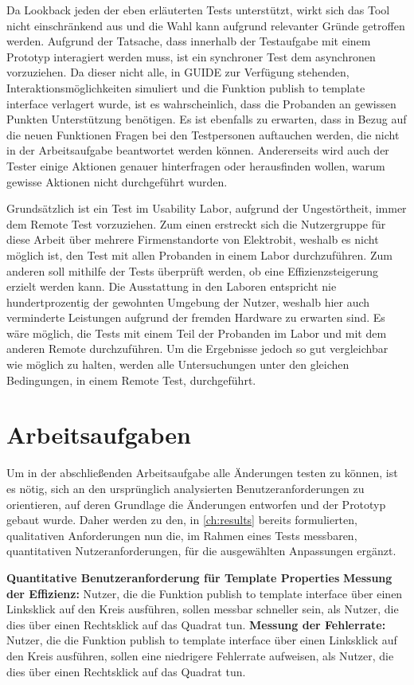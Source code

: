 Da Lookback jeden der eben erläuterten Tests unterstützt, wirkt sich das Tool nicht einschränkend aus und die Wahl kann aufgrund relevanter Gründe getroffen werden.
Aufgrund der Tatsache, dass innerhalb der Testaufgabe mit einem Prototyp interagiert werden muss, ist ein synchroner Test dem asynchronen vorzuziehen.
Da dieser nicht alle, in GUIDE zur Verfügung stehenden, Interaktionsmöglichkeiten simuliert und die Funktion \glqq publish to template interface\grqq{} verlagert wurde, ist es wahrscheinlich, dass die Probanden an gewissen Punkten Unterstützung benötigen.
Es ist ebenfalls zu erwarten, dass in Bezug auf die neuen Funktionen Fragen bei den Testpersonen auftauchen werden, die nicht in der Arbeitsaufgabe beantwortet werden können.
Andererseits wird auch der Tester einige Aktionen genauer hinterfragen oder herausfinden wollen, warum gewisse Aktionen nicht durchgeführt wurden.

Grundsätzlich ist ein Test im Usability Labor, aufgrund der Ungestörtheit, immer dem Remote Test vorzuziehen.
Zum einen erstreckt sich die Nutzergruppe für diese Arbeit über mehrere Firmenstandorte von Elektrobit, weshalb es nicht möglich ist, den Test mit allen Probanden in einem Labor durchzuführen.
Zum anderen soll mithilfe der Tests überprüft werden, ob eine Effizienzsteigerung erzielt werden kann.
Die Ausstattung in den Laboren entspricht nie hundertprozentig der gewohnten Umgebung der Nutzer, weshalb hier auch verminderte Leistungen aufgrund der fremden Hardware zu erwarten sind.
Es wäre möglich, die Tests mit einem Teil der Probanden im Labor und mit dem anderen Remote durchzuführen.
Um die Ergebnisse jedoch so gut vergleichbar wie möglich zu halten, werden alle Untersuchungen unter den gleichen Bedingungen, in einem Remote Test, durchgeführt.

\section{Arbeitsaufgaben}
Um in der abschließenden Arbeitsaufgabe alle Änderungen testen zu können, ist es nötig, sich an den ursprünglich analysierten Benutzeranforderungen zu orientieren, auf deren Grundlage die Änderungen entworfen und der Prototyp gebaut wurde.
Daher werden zu den, in  \cref{ch:results} bereits formulierten, qualitativen Anforderungen nun die, im Rahmen eines Tests messbaren, quantitativen Nutzeranforderungen, für die ausgewählten Anpassungen ergänzt.

\textbf{Quantitative Benutzeranforderung für Template Properties}\newline
\textbf{Messung der Effizienz:}
Nutzer, die die Funktion \glqq publish to template interface\grqq{} über einen Linksklick auf den Kreis ausführen, sollen messbar schneller sein, als Nutzer, die dies über einen Rechtsklick auf das Quadrat tun. \newline
\textbf{Messung der Fehlerrate:} 
Nutzer, die die Funktion \glqq publish to template interface\grqq{} über einen Linksklick auf den Kreis ausführen, sollen eine niedrigere Fehlerrate aufweisen, als Nutzer, die dies über einen Rechtsklick auf das Quadrat tun.

